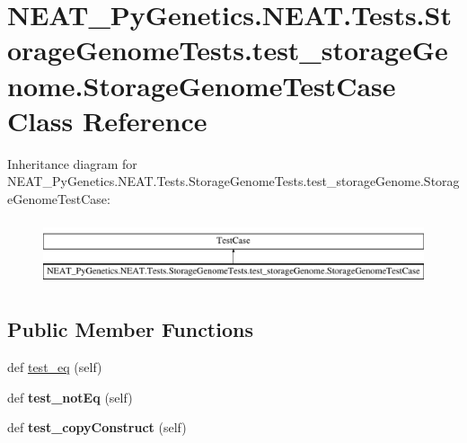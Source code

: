 \hypertarget{class_n_e_a_t___py_genetics_1_1_n_e_a_t_1_1_tests_1_1_storage_genome_tests_1_1test__storage_genome_1_1_storage_genome_test_case}{}\section{N\+E\+A\+T\+\_\+\+Py\+Genetics.\+N\+E\+A\+T.\+Tests.\+Storage\+Genome\+Tests.\+test\+\_\+storage\+Genome.\+Storage\+Genome\+Test\+Case Class Reference}
\label{class_n_e_a_t___py_genetics_1_1_n_e_a_t_1_1_tests_1_1_storage_genome_tests_1_1test__storage_genome_1_1_storage_genome_test_case}
Inheritance diagram for N\+E\+A\+T\+\_\+\+Py\+Genetics.\+N\+E\+A\+T.\+Tests.\+Storage\+Genome\+Tests.\+test\+\_\+storage\+Genome.\+Storage\+Genome\+Test\+Case\+:\begin{figure}[H]
\begin{center}
\leavevmode
\includegraphics[height=1.927711cm]{class_n_e_a_t___py_genetics_1_1_n_e_a_t_1_1_tests_1_1_storage_genome_tests_1_1test__storage_genome_1_1_storage_genome_test_case}
\end{center}
\end{figure}
\subsection*{Public Member Functions}
\begin{DoxyCompactItemize}
\item 
def \hyperlink{class_n_e_a_t___py_genetics_1_1_n_e_a_t_1_1_tests_1_1_storage_genome_tests_1_1test__storage_genome_1_1_storage_genome_test_case_a27b58493e931470520a1e71e514009cb}{test\+\_\+eq} (self)
\item 
def {\bfseries test\+\_\+not\+Eq} (self)\hypertarget{class_n_e_a_t___py_genetics_1_1_n_e_a_t_1_1_tests_1_1_storage_genome_tests_1_1test__storage_genome_1_1_storage_genome_test_case_a01f81b00e989464c932df722135daf5c}{}\label{class_n_e_a_t___py_genetics_1_1_n_e_a_t_1_1_tests_1_1_storage_genome_tests_1_1test__storage_genome_1_1_storage_genome_test_case_a01f81b00e989464c932df722135daf5c}

\item 
def {\bfseries test\+\_\+copy\+Construct} (self)\hypertarget{class_n_e_a_t___py_genetics_1_1_n_e_a_t_1_1_tests_1_1_storage_genome_tests_1_1test__storage_genome_1_1_storage_genome_test_case_a4c670f9b3e78d2be50280880f1de23d5}{}\label{class_n_e_a_t___py_genetics_1_1_n_e_a_t_1_1_tests_1_1_storage_genome_tests_1_1test__storage_genome_1_1_storage_genome_test_case_a4c670f9b3e78d2be50280880f1de23d5}

\end{DoxyCompactItemize}


